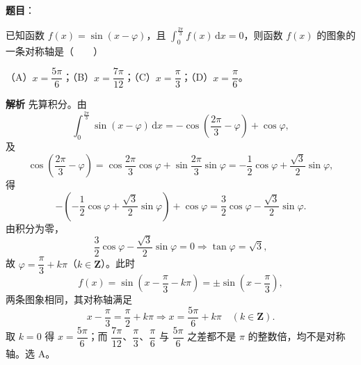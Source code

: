 \begin{answer}

\textbf{题目}：

已知函数 $f(x)=\sin(x-\varphi)$，且 $\displaystyle\int_0^{\frac{2\pi}3}f(x)\,\mathrm dx=0$，则函数 $f(x)$ 的图象的一条对称轴是\mbox{（　　）}

（A）$x=\dfrac{5\pi}6$；（B）$x=\dfrac{7\pi}{12}$；（C）$x=\dfrac\pi3$；（D）$x=\dfrac\pi6$。

\textbf{解析}
先算积分。由
\nopagebreak[4]
\[\int_0^{\frac{2\pi}3}\sin(x-\varphi)\,\mathrm dx=-\cos\left(\frac{2\pi}3-\varphi\right)+\cos\varphi,\]
及
\nopagebreak[4]
\[\cos\left(\frac{2\pi}3-\varphi\right)=\cos\frac{2\pi}3\cos\varphi+\sin\frac{2\pi}3\sin\varphi=-\frac12\cos\varphi+\frac{\sqrt3}2\sin\varphi,\]
得
\nopagebreak[4]
\[-\left(-\frac12\cos\varphi+\frac{\sqrt3}2\sin\varphi\right)+\cos\varphi=\frac32\cos\varphi-\frac{\sqrt3}2\sin\varphi .\]
由积分为零，
\nopagebreak[4]
\[\frac32\cos\varphi-\frac{\sqrt3}2\sin\varphi=0\Longrightarrow\tan\varphi=\sqrt3,\]
故 $\varphi=\dfrac\pi3+k\pi$（$k\in\mathbf Z$）。此时
\nopagebreak[4]
\[f(x)=\sin\left(x-\frac\pi3-k\pi\right)=\pm\sin\left(x-\frac\pi3\right),\]
两条图象相同，其对称轴满足
\nopagebreak[4]
\[x-\frac\pi3=\frac\pi2+k\pi\Longrightarrow x=\frac{5\pi}6+k\pi\quad(k\in\mathbf Z).\]
取 $k=0$ 得 $x=\dfrac{5\pi}6$；而 $\dfrac{7\pi}{12}$、$\dfrac\pi3$、$\dfrac\pi6$ 与 $\dfrac{5\pi}6$ 之差都不是 $\pi$ 的整数倍，均不是对称轴。选 A。


\end{answer}
